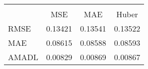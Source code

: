\begin{tabular}{lccc}
\hline\hline \\ [-1.8ex]
 & MSE & MAE & Huber \\ 
 \hline 
RMSE & 0.13421 & 0.13541 & 0.13522 \\ 
MAE & 0.08615 & 0.08588 & 0.08593 \\ 
AMADL & 0.00829 & 0.00869 & 0.00867 \\ 
\hline\hline
\end{tabular}
